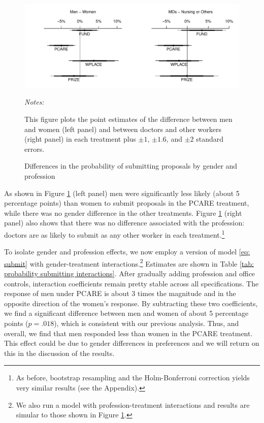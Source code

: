 \documentclass[11pt, titlepage]{article}
\newenvironment{tablenotes}[1][]{
  \begin{minipage}{\textwidth}\emph{Notes:}{\footnotesize #1}
}{\end{minipage}}
\begin{document}
\begin{figure} 
  \centering
  \caption{Differences in the probability of submitting proposals by gender and profession}
  \label{fig: interactions}
  \includegraphics{Figures/plot-gender-1.pdf}
  \begin{tablenotes}
  This figure plots the point estimates of the difference between men and women (left panel) and between doctors and other workers (right panel) in each treatment plus $\pm 1$, $\pm 1.6$, and $\pm 2$ standard errors.%
  \end{tablenotes}
\end{figure}

As shown in Figure \ref{fig: interactions} (left panel) men were
significantly less likely (about 5 percentage points) than women to
submit proposals in the PCARE treatment, while there was no gender
difference in the other treatments. Figure \ref{fig: interactions}
(right panel) also shows that there was no difference associated with
the profession: doctors are as likely to submit as any other worker in
each treatment.\footnote{As before, bootstrap resampling and the
  Holm-Bonferroni correction yields very similar results (see the
  Appendix).}

To isolate gender and profession effects, we now employ a version of
model \eqref{eq: submit} with gender-treatment interactions.\footnote{We
  also run a model with profession-treatment interactions and results
  are simular to those shown in Figure \ref{fig: interactions}.}
Estimates are shown in Table
\ref{tab: probability submitting interactions}. After gradually adding
profession and office controls, interaction coefficients remain pretty
stable across all specifications. The response of men under PCARE is
about 3 times the magnitude and in the opposite direction of the women's
response. By subtracting these two coefficients, we find a significant
difference between men and women of about 5 percentage points
(\(p=.018\)), which is consistent with our previous analysis. Thus, and
overall, we find that men responded less than women in the PCARE
treatment. This effect could be due to gender differences in preferences
and we will return on this in the discussion of the results.
\end{document}
